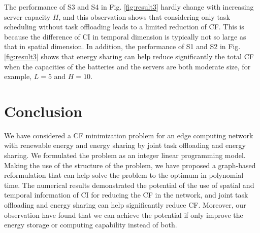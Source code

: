 \documentclass[conference, 10pt, ﬁnal, letterpaper, twocolumn]{IEEEtran}
\begin{document}
The performance of S3 and S4 in Fig. \ref{fig:result3} hardly change with increasing server capacity $H$, and this observation shows that considering only task scheduling without task offloading leads to a limited reduction of CF. This is because the difference of CI in temporal dimension is typically not so large as that in spatial dimension. In addition, the performance of S1 and S2 in Fig. \ref{fig:result3} shows that energy sharing can help reduce significantly the total CF when the capacities of the batteries and the servers are both moderate size, for example, $L = 5$ and $H = 10$. 

\section{Conclusion} \label{Sec:conclusion}
We have considered a CF minimization problem for an edge computing network with renewable energy and energy sharing by joint task offloading and energy sharing. We formulated the problem as an integer linear programming model. Making the use of the structure of the problem, we have proposed a graph-based reformulation that can help solve the problem to the optimum in polynomial time. The numerical results demonstrated the potential of the use of spatial and temporal information of CI for reducing the CF in the network, and joint task offloading and energy sharing can help significantly reduce CF. Moreover, our observation have found that we can achieve the potential if only improve the energy storage or computing capability instead of both.



\end{document}

